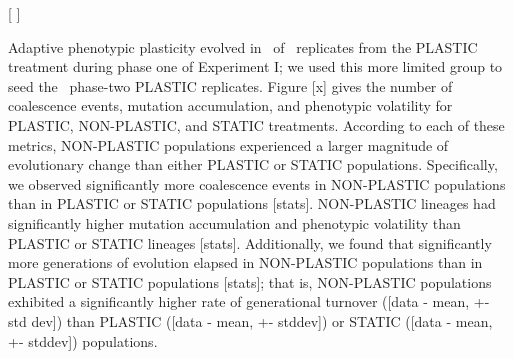 [
]

Adaptive phenotypic plasticity evolved in \evolutionaryChangeRatePlasticReps\ of \evolutionaryChangeRateReplicates\ replicates from the PLASTIC treatment during phase one of Experiment I; we used this more limited group to seed the \evolutionaryChangeRatePlasticReps\ phase-two PLASTIC replicates.
Figure [x] gives the number of coalescence events, mutation accumulation, and phenotypic volatility for PLASTIC, NON-PLASTIC, and STATIC treatments.
According to each of these metrics, NON-PLASTIC populations experienced a larger magnitude of evolutionary change than either PLASTIC or STATIC populations.
Specifically, we observed significantly more coalescence events in NON-PLASTIC populations than in PLASTIC or STATIC populations [stats].
NON-PLASTIC lineages had significantly higher mutation accumulation and phenotypic volatility than PLASTIC or STATIC lineages [stats].
Additionally, we found that significantly more generations of evolution elapsed in NON-PLASTIC populations than in PLASTIC or STATIC populations [stats]; that is, NON-PLASTIC populations exhibited a significantly higher rate of generational turnover ([data - mean, +- std dev]) than PLASTIC ([data - mean, +- stddev]) or STATIC ([data - mean, +- stddev]) populations.

